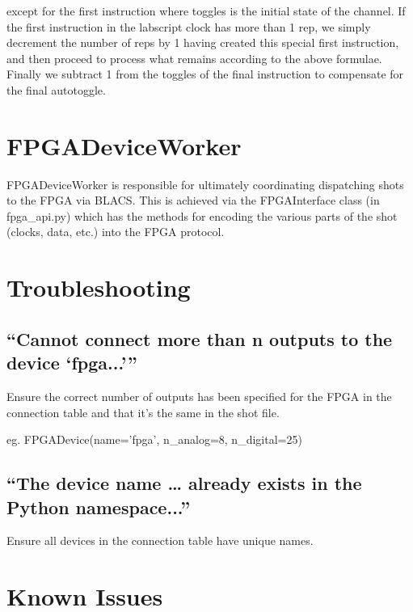 \documentclass[11pt,a4paper]{article}
\begin{document}
except for the first instruction where toggles is the initial state of
the channel. If the first instruction in the labscript clock has more
than 1 rep, we simply decrement the number of reps by 1 having created
this special first instruction, and then proceed to process what remains
according to the above formulae. Finally we subtract 1 from the toggles
of the final instruction to compensate for the final autotoggle.

\section{FPGADeviceWorker}

FPGADeviceWorker is responsible for ultimately coordinating dispatching shots to the FPGA via BLACS. This is achieved via the FPGAInterface class (in fpga\_api.py) which has the methods for encoding the various parts of the shot (clocks, data, etc.) into the FPGA protocol.

\section{Troubleshooting}

\subsection{``Cannot connect more than n outputs to the device `fpga...'''}

Ensure the correct number of outputs has been specified for the FPGA in the connection table and that it's the same in the shot file.

eg. FPGADevice(name='fpga', n\_analog=8, n\_digital=25)

\subsection{``The device name \ldots{} already exists in the Python namespace...''}
Ensure all devices in the connection table have unique names.

\section{Known Issues}
\end{document}
